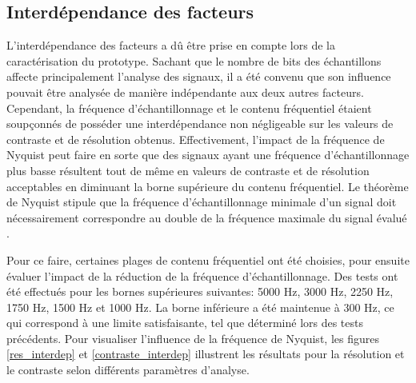 ﻿\documentclass[11pt,letterpaper]{article}
\begin{document}




\subsection{Interdépendance des facteurs}
L'interdépendance des facteurs a dû être prise en compte lors de la caractérisation du prototype. Sachant que le nombre
de bits des échantillons affecte principalement l'analyse des signaux, il a été convenu que son influence pouvait être analysée
de manière indépendante aux deux autres facteurs. Cependant, la fréquence d'échantillonnage et le contenu fréquentiel étaient soupçonnés
de posséder une interdépendance non négligeable sur les valeurs de contraste et de résolution obtenus. Effectivement, l'impact de la fréquence
de Nyquist peut faire en sorte que des signaux ayant une fréquence d'échantillonnage plus basse résultent tout de même  en valeurs de contraste et de résolution acceptables en diminuant la borne supérieure du contenu fréquentiel. Le théorème de Nyquist stipule que la fréquence d'échantillonnage
minimale d'un signal doit nécessairement correspondre au double de la fréquence maximale du signal évalué \cite{nyquist}. 

Pour ce faire, certaines plages de contenu fréquentiel ont été choisies, pour ensuite évaluer l'impact de la réduction de la fréquence 
d'échantillonnage. Des tests ont été effectués pour les bornes supérieures suivantes: 5000 Hz, 3000 Hz, 2250 Hz, 1750 Hz, 1500 Hz et 1000 Hz.
La borne inférieure a été maintenue à 300 Hz, ce qui correspond à une limite satisfaisante, tel que déterminé lors des tests précédents. Pour visualiser
l'influence de la fréquence de Nyquist, les figures \ref{res_interdep} et \ref{contraste_interdep} illustrent les résultats pour la résolution et le contraste selon différents paramètres d'analyse.
\end{document}
